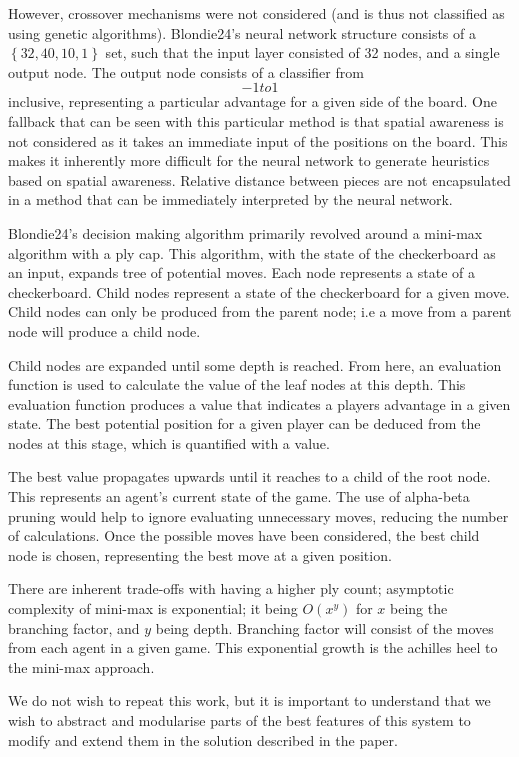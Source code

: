 \documentclass[12pt,a4paper]{article}
\begin{document}
        However, crossover mechanisms were not considered (and is thus not classified as using genetic algorithms). Blondie24's neural network structure consists of a $\left\{ 32,40,10,1 \right\}$ set, such that the input layer consisted of 32 nodes, and a single output node. The output node consists of a classifier from \[-1 to 1\] inclusive, representing a particular advantage for a given side of the board. One fallback that can be seen with this particular method is that spatial awareness is not considered as it takes an immediate input of the positions on the board. This makes it inherently more difficult for the neural network to generate heuristics based on spatial awareness. Relative distance between pieces are not encapsulated in a method that can be immediately interpreted by the neural network.

        Blondie24's decision making algorithm primarily revolved around a mini-max algorithm with a ply cap. This algorithm, with the state of the checkerboard as an input, expands tree of potential moves. Each node represents a state of a checkerboard. Child nodes represent a state of the checkerboard for a given move. Child nodes can only be produced from the parent node; i.e a move from a parent node will produce a child node. 
    
        Child nodes are expanded until some depth is reached. From here, an evaluation function is used to calculate the value of the leaf nodes at this depth. This evaluation function produces a value that indicates a players advantage in a given state. The best potential position for a given player can be deduced from the nodes at this stage, which is quantified with a value.
    
        The best value propagates upwards until it reaches to a child of the root node. This represents an agent's current state of the game. The use of alpha-beta pruning would help to ignore evaluating unnecessary moves, reducing the number of calculations. Once the possible moves have been considered, the best child node is chosen, representing the best move at a given position.
    
        There are inherent trade-offs with having a higher ply count; asymptotic complexity of mini-max is exponential; it being $O(x^y)$ for $x$ being the branching factor, and $y$ being depth. Branching factor will consist of the moves from each agent in a given game. This exponential growth is the achilles heel to the mini-max approach.

        We do not wish to repeat this work, but it is important to understand that we wish to abstract and modularise parts of the best features of this system to modify and extend them in the solution described in the paper.
\end{document}
